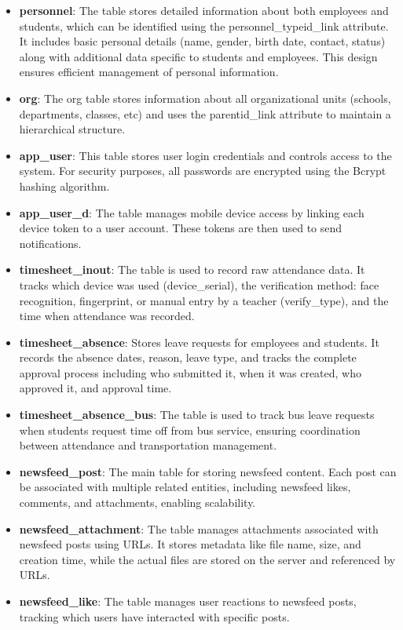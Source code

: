 \begin{itemize}[itemsep=-0.1cm]
    \item \textbf{personnel}: The table stores detailed information about both employees and students, which can be identified using the personnel\_typeid\_link attribute. It includes basic personal details (name, gender, birth date, contact, status) along with additional data specific to students and employees. This design ensures efficient management of personal information.
    \item \textbf{org}: The org table stores information about all organizational units (schools, departments, classes, etc) and uses the parentid\_link attribute to maintain a hierarchical structure.
    \item \textbf{app\_user}: This table stores user login credentials and controls access to the system. For security purposes, all passwords are encrypted using the Bcrypt hashing algorithm.
    \item \textbf{app\_user\_d}: The table manages mobile device access by linking each device token to a user account. These tokens are then used to send notifications.
    \item \textbf{timesheet\_inout}: The table is used to record raw attendance data. It tracks which device was used (device\_serial), the verification method: face recognition, fingerprint, or manual entry by a teacher (verify\_type), and the time when attendance was recorded.
    \item \textbf{timesheet\_absence}: Stores leave requests for employees and students. It records the absence dates, reason, leave type, and tracks the complete approval process including who submitted it, when it was created, who approved it, and approval time.
    \item \textbf{timesheet\_absence\_bus}: The table is used to track bus leave requests when students request time off from bus service, ensuring coordination between attendance and transportation management.
    \item \textbf{newsfeed\_post}: The main table for storing newsfeed content. Each post can be associated with multiple related entities, including newsfeed likes, comments, and attachments, enabling scalability.
    \item \textbf{newsfeed\_attachment}: The table manages attachments associated with newsfeed posts using URLs. It stores metadata like file name, size, and creation time, while the actual files are stored on the server and referenced by URLs.
    \item \textbf{newsfeed\_like}: The table manages user reactions to newsfeed posts, tracking which users have interacted with specific posts.

\end{itemize}
